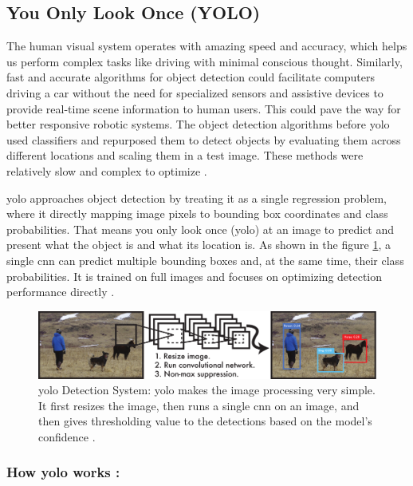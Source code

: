 \subsection{You Only Look Once (YOLO)}
\label{subsec:yolo}

The human visual system operates with amazing speed and accuracy, which helps us perform complex tasks like driving with minimal conscious thought. Similarly, fast and accurate algorithms for object detection could facilitate computers driving a car without the need for specialized sensors and assistive devices to provide real-time scene information to human users. This could pave the way for better responsive robotic systems. The object detection algorithms before \gls{yolo} used classifiers and repurposed them to detect objects by evaluating them across different locations and scaling them in a test image. These methods were relatively slow and complex to optimize \cite{redmon2016you}.

\gls{yolo} approaches object detection by treating it as a single regression problem, where it directly mapping image pixels to bounding box coordinates and class probabilities. That means you only look once (\gls{yolo}) at an image to predict and present what the object is and what its location is. As shown in the figure \ref{fig:yolo system}, a single \gls{cnn} can predict multiple bounding boxes and, at the same time, their class probabilities. It is trained on full images and focuses on optimizing detection performance directly \cite{redmon2016you}.

\begin{figure}[ht!]
    \centering
    \includegraphics[width=1\linewidth]{Rohit_Master_Thesis//Images/yolo_system.pdf}
    \caption{\gls{yolo} Detection System: \gls{yolo} makes the image processing very simple. It first resizes the image, then runs a single \gls{cnn} on an image, and then gives thresholding value to the detections based on the model's confidence \cite{redmon2016you}.}
    \label{fig:yolo system}
\end{figure}


\subsubsection*{ How \gls{yolo} works :}

